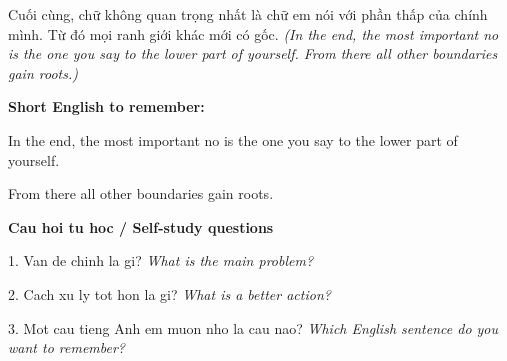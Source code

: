 \begin{baihoc}
Cuối cùng, chữ không quan trọng nhất là chữ em nói với phần thấp của chính mình. Từ đó mọi ranh giới khác mới có gốc.
\textit{(In the end, the most important no is the one you say to the lower part of yourself. From there all other boundaries gain roots.)}
\end{baihoc}

\begin{ghinhoanh}
\textbf{Short English to remember:}

In the end, the most important no is the one you say to the lower part of yourself.

From there all other boundaries gain roots.

\end{ghinhoanh}

\begin{tuhocnhanh}
\textbf{Cau hoi tu hoc / Self-study questions}

1. Van de chinh la gi? \textit{What is the main problem?}

2. Cach xu ly tot hon la gi? \textit{What is a better action?}

3. Mot cau tieng Anh em muon nho la cau nao? \textit{Which English sentence do you want to remember?}
\end{tuhocnhanh}
